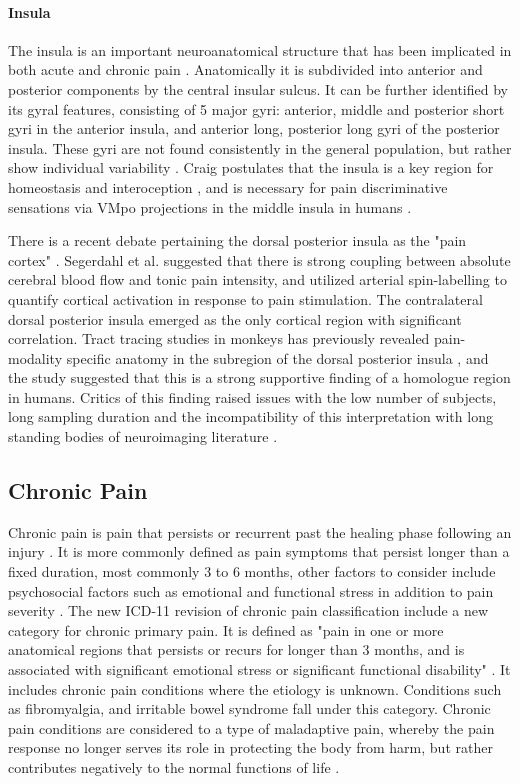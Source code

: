 \paragraph{Insula}

The insula is an important neuroanatomical structure that has been implicated in both acute \cite{Lorenz2005,Starr2009} and chronic pain \cite{May2008,Jensen2016}. Anatomically it is subdivided into anterior and posterior components by the central insular sulcus. It can be further identified by its gyral features, consisting of 5 major gyri: anterior, middle and posterior short gyri in the anterior insula, and anterior long, posterior long gyri of the posterior insula. These gyri are not found consistently in the general population, but rather show individual variability \cite{Rosen2015}. Craig postulates that the insula is a key region for homeostasis and interoception \cite{Craig2003b}, and is necessary for pain discriminative sensations via VMpo projections in the middle insula in humans \cite{Craig2003a}. 

There is a recent debate pertaining the dorsal posterior insula as the "pain cortex" \cite{Segerdahl2015a}. Segerdahl et al. suggested that there is strong coupling between absolute cerebral blood flow and tonic pain intensity, and utilized arterial spin-labelling to quantify cortical activation in response to pain stimulation. The contralateral dorsal posterior insula emerged as the only cortical region with significant correlation. Tract tracing studies in monkeys has previously revealed pain-modality specific anatomy in the subregion of the dorsal posterior insula \cite{Craig2014}, and the study suggested that this is a strong supportive finding of a homologue region in humans. Critics of this finding raised issues with the low number of subjects, long sampling duration and the incompatibility of this interpretation with long standing bodies of neuroimaging literature \cite{Davis2015}. 

\subsection{Chronic Pain}

Chronic pain is pain that persists or recurrent past the healing phase following an injury \cite{Apkarian2009,Merskey2012}. It is more commonly defined as pain symptoms that persist longer than a fixed duration, most commonly 3 to 6 months, other factors to consider include psychosocial factors such as emotional and functional stress in addition to pain severity \cite{Treede2015}. The new ICD-11 revision of chronic pain classification include a new category for chronic primary pain. It is defined as "pain in one or more anatomical regions that persists or recurs for longer than 3 months, and is associated with significant emotional stress or significant functional disability" \cite{Treede2015}. It includes chronic pain conditions where the etiology is unknown. Conditions such as fibromyalgia, and irritable bowel syndrome fall under this category. Chronic pain conditions are considered to a type of maladaptive pain, whereby the pain response no longer serves its role in protecting the body from harm, but rather contributes negatively to the normal functions of life \cite{May2008}. 


